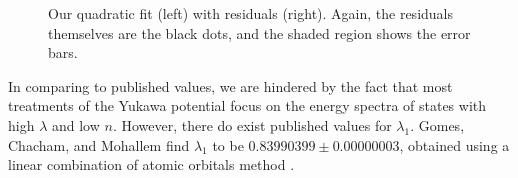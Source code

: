 \documentclass[12pt,twoside]{reedthesis}
\begin{document}
\begin{figure}[h]
\centering
{}
\caption[Quadratic fit and residuals]{Our quadratic fit (left) with residuals (right). Again, the residuals themselves are the black dots, and the shaded region shows the error bars.}
\label{fig:quadfit}
\end{figure}



In comparing to published values, we are hindered by the fact that most treatments of the Yukawa potential focus on the energy spectra of states with high $\lambda$ and low $n$. However, there do exist published values for $\lambda_1$. Gomes, Chacham, and Mohallem find  $\lambda_1$ to be $0.83990399 \pm 0.00000003$, obtained using a linear combination of atomic orbitals method \cite{PhysRevA.50.228}.
\end{document}
